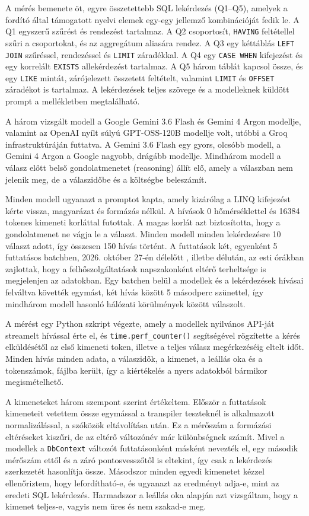 
A mérés bemenete öt, egyre összetettebb SQL lekérdezés (Q1--Q5), amelyek a fordító által támogatott nyelvi elemek egy-egy jellemző kombinációját fedik le. A Q1 egyszerű szűrést és rendezést tartalmaz. A Q2 csoportosít, \texttt{HAVING} feltétellel szűri a csoportokat, és az aggregátum aliasára rendez. A Q3 egy kéttáblás \texttt{LEFT JOIN} szűréssel, rendezéssel és \texttt{LIMIT} záradékkal. A Q4 egy \texttt{CASE WHEN} kifejezést és egy korrelált \texttt{EXISTS} allekérdezést tartalmaz. A Q5 három táblát kapcsol össze, és egy \texttt{LIKE} mintát, zárójelezett összetett feltételt, valamint \texttt{LIMIT} és \texttt{OFFSET} záradékot is tartalmaz. A lekérdezések teljes szövege és a modelleknek küldött prompt a mellékletben megtalálható.

A három vizsgált modell a Google Gemini 3.6 Flash és Gemini 4 Argon modellje, valamint az OpenAI nyílt súlyú GPT-OSS-120B modellje volt, utóbbi a Groq infrastruktúráján futtatva. A Gemini 3.6 Flash egy gyors, olcsóbb modell, a Gemini 4 Argon a Google nagyobb, drágább modellje. Mindhárom modell a válasz előtt belső gondolatmenetet (reasoning) állít elő, amely a válaszban nem jelenik meg, de a válaszidőbe és a költségbe beleszámít.

Minden modell ugyanazt a promptot kapta, amely kizárólag a LINQ kifejezést kérte vissza, magyarázat és formázás nélkül. A hívások 0 hőmérséklettel és 16384 tokenes kimeneti korláttal futottak. A magas korlát azt biztosította, hogy a gondolatmenet ne vágja le a választ. Minden modell minden lekérdezésre 10 választ adott, így összesen 150 hívás történt. A futtatások két, egyenként 5 futtatásos batchben, 2026. október 27-én délelőtt , illetbe délután, az esti órákban zajlottak, hogy a felhőszolgáltatások napszakonként eltérő terheltsége is megjelenjen az adatokban. Egy batchen belül a modellek és a lekérdezések hívásai felváltva követték egymást, két hívás között 5 másodperc szünettel, így mindhárom modell hasonló hálózati körülmények között válaszolt.

A mérést egy Python szkript végezte, amely a modellek nyilvános API-ját streamelt hívással érte el, és \texttt{time.perf\_counter()} segítségével rögzítette a kérés elküldésétől az első kimeneti token, illetve a teljes válasz megérkezéséig eltelt időt.    Minden hívás minden adata, a válaszidők, a kimenet, a leállás oka és a tokenszámok, fájlba került, így a kiértékelés a nyers adatokból bármikor megismételhető.

A kimeneteket három szempont szerint értékeltem. Először a futtatások kimeneteit vetettem össze egymással a transpiler teszteknél is alkalmazott normalizálással, a szóközök eltávolítása után. Ez a mérőszám a formázási eltéréseket kiszűri, de az eltérő változónév már különbségnek számít. Mivel a modellek a \texttt{DbContext} változót futtatásonként másként nevezték el, egy második mérőszám ettől és a záró pontosvesszőtől is eltekint, így csak a lekérdezés szerkezetét hasonlítja össze. Másodszor minden egyedi kimenetet kézzel ellenőriztem, hogy lefordítható-e, és ugyanazt az eredményt adja-e, mint az eredeti SQL lekérdezés. Harmadszor a leállás oka alapján azt vizsgáltam, hogy a kimenet teljes-e, vagyis nem üres és nem szakad-e meg.

